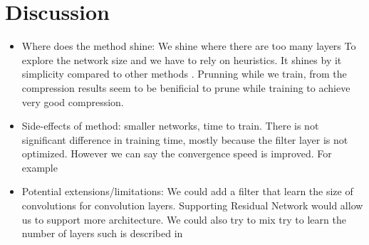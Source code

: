 \section{Discussion}


\begin{itemize}
  \item Where does the method shine:  We shine where there are too many layers
    To explore the network size and we have to rely on heuristics. It shines by
    it simplicity compared to other methods . Prunning while we train, from the compression
    results seem to be benificial to prune while training to achieve very good
    compression.
  \item Side-effects of method: smaller networks, time to train. There is not
    significant difference in training time, mostly because the filter layer is
    not optimized. However we can say the convergence speed is improved. For
    example
  \item Potential extensions/limitations: We could add a filter that learn the
    size of convolutions for convolution layers. Supporting Residual Network
    would allow us to support more architecture. We could also try to mix try to
    learn the number of layers such is described in~\cite{meier}
\end{itemize}